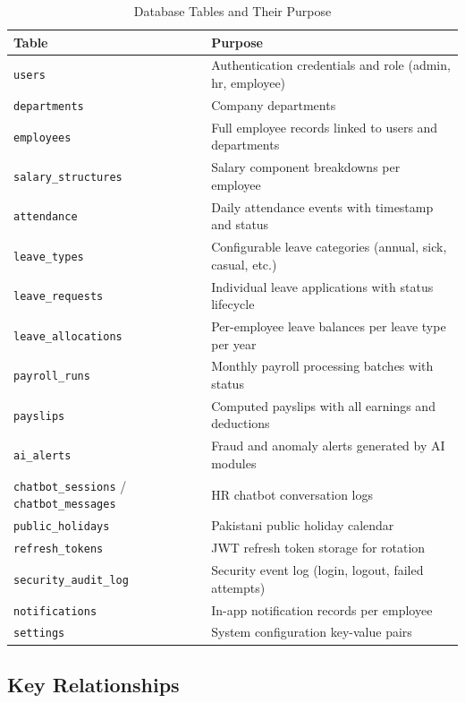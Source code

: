 \documentclass[12pt,a4paper]{report}
\begin{document}
\begin{table}[H]
\centering
\caption{Database Tables and Their Purpose}
\label{tab:db_tables}
\begin{tabular}{|l|p{9cm}|}
\hline
\textbf{Table} & \textbf{Purpose} \\
\hline
\texttt{users}             & Authentication credentials and role (admin, hr, employee) \\
\hline
\texttt{departments}       & Company departments \\
\hline
\texttt{employees}         & Full employee records linked to users and departments \\
\hline
\texttt{salary\_structures} & Salary component breakdowns per employee \\
\hline
\texttt{attendance}        & Daily attendance events with timestamp and status \\
\hline
\texttt{leave\_types}      & Configurable leave categories (annual, sick, casual, etc.) \\
\hline
\texttt{leave\_requests}   & Individual leave applications with status lifecycle \\
\hline
\texttt{leave\_allocations} & Per-employee leave balances per leave type per year \\
\hline
\texttt{payroll\_runs}     & Monthly payroll processing batches with status \\
\hline
\texttt{payslips}          & Computed payslips with all earnings and deductions \\
\hline
\texttt{ai\_alerts}        & Fraud and anomaly alerts generated by AI modules \\
\hline
\texttt{chatbot\_sessions} / \texttt{chatbot\_messages} & HR chatbot conversation logs \\
\hline
\texttt{public\_holidays}  & Pakistani public holiday calendar \\
\hline
\texttt{refresh\_tokens}   & JWT refresh token storage for rotation \\
\hline
\texttt{security\_audit\_log} & Security event log (login, logout, failed attempts) \\
\hline
\texttt{notifications}     & In-app notification records per employee \\
\hline
\texttt{settings}          & System configuration key-value pairs \\
\hline
\end{tabular}
\end{table}

\subsection{Key Relationships}
\end{document}

